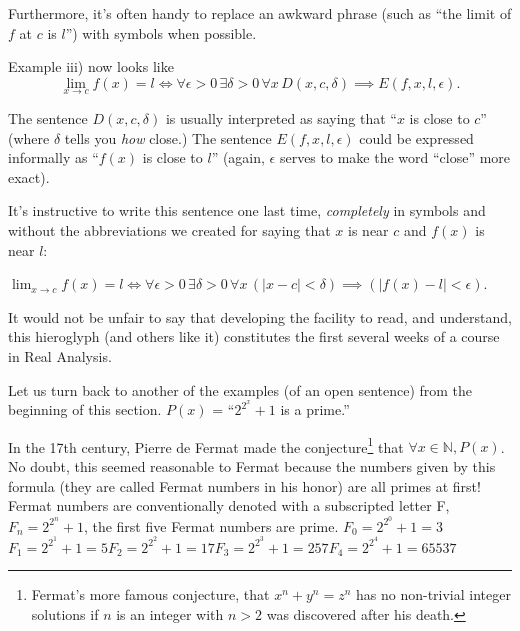 \documentclass[10pt,]{book}
\theoremstyle{plain}
\theoremstyle{definition}
\theoremstyle{definition}
\numberwithin{equation}{section}
\newcommand{\lt}{ < }
\begin{document}
    Furthermore, it's often handy to replace an awkward phrase (such as
    ``the limit of \(f\) at \(c\) is \(l\)'') with symbols when possible.
\par

    Example iii) now looks like
    \begin{equation*}
      \lim_{x\rightarrow c}f(x) = l \iff \forall \epsilon>0 \, \exists \delta>0 \, \forall x \, D(x,c,\delta) \implies E(f,x,l,\epsilon).
    \end{equation*}
\par

    The sentence \(D(x,c,\delta)\) is usually interpreted as saying that
    ``\(x\) is close to \(c\)'' (where \(\delta\) tells you \emph{how} close.)
    The sentence \(E(f,x,l,\epsilon)\) could be expressed informally as
    ``\(f(x)\) is close to \(l\)'' (again, \(\epsilon\) serves to make the
    word ``close'' more exact).
\par

    It's instructive to write this sentence one last time, \emph{completely}
    in symbols and without the abbreviations we created for saying
    that \(x\) is near \(c\) and \(f(x)\) is near \(l\):
\par

    \(\displaystyle \lim_{x\rightarrow c}f(x) = l \iff \forall \epsilon>0 \, \exists 
    \delta>0 \, \forall x \, (|x-c| \lt  \delta) \implies (|f(x)-l| \lt  \epsilon)\).
\par

    It would not be unfair to say that developing the facility to read,
    and understand, this hieroglyph (and others like it) constitutes the
    first several weeks of a course in Real Analysis.
\par

    Let us turn back to another of the examples (of an open sentence) from the
    beginning of this section. \(P(x)\) = ``\(2^{2^x}+1\) is a prime.''
\par

    In the 17th century, Pierre de Fermat
    made the conjecture\footnote{Fermat's 
    more famous conjecture, that \(x^n+y^n=z^n\) has no non-trivial integer solutions
    if \(n\) is an integer with \(n>2\) was discovered after his death.\label{fn-15}} that
    \(\forall x \in {\mathbb N}, P(x)\). No doubt, this seemed reasonable to Fermat
    because the numbers given by this formula (they are called
    Fermat numbers in
    his honor) are all primes \textemdash{} at first! Fermat numbers are conventionally
    denoted with a subscripted letter F, \(F_n = 2^{2^n}+1\), the first five
    Fermat numbers are prime.
\(\displaystyle F_0 = 2^{2^0}+1 = 3\)\(\displaystyle F_1 = 2^{2^1}+1 = 5\)\(\displaystyle F_2 = 2^{2^2}+1 = 17\)\(\displaystyle F_3 = 2^{2^3}+1 = 257\)\(\displaystyle F_4 = 2^{2^4}+1 = 65537\)\par
\end{document}
